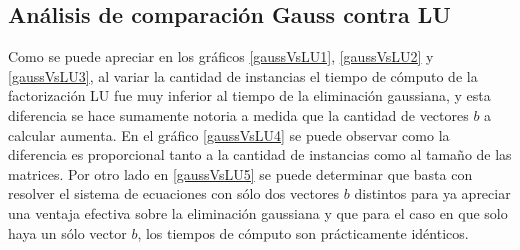 \subsection{Análisis de comparación Gauss contra LU}
Como se puede apreciar en los gráficos \ref{gaussVsLU1}, \ref{gaussVsLU2} y \ref{gaussVsLU3}, al
variar la cantidad de instancias el tiempo de cómputo de la factorización LU fue muy inferior al
tiempo de la eliminación gaussiana, y esta diferencia se hace sumamente notoria a medida que la
cantidad de vectores $b$ a calcular aumenta. En el gráfico \ref{gaussVsLU4} se puede observar como
la diferencia es proporcional tanto a la cantidad de instancias como al tamaño de las matrices. Por
otro lado en \ref{gaussVsLU5} se puede determinar que basta con resolver el sistema de ecuaciones
con sólo dos vectores $b$ distintos para ya apreciar una ventaja efectiva sobre la eliminación gaussiana y que para el caso en que solo haya un sólo vector $b$, los tiempos de cómputo son prácticamente idénticos.
